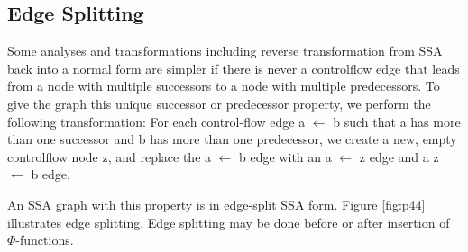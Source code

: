 

\subsection{Edge Splitting}

Some analyses and transformations including reverse transformation from SSA back into a normal form are simpler if there is never a controlflow edge that leads from a node with multiple successors to a node with multiple predecessors. To give the graph this unique successor or predecessor property, we perform the following transformation: For each control-flow edge a $\gets$ b such that a has more than one successor and b has more than one predecessor, we create a new, empty controlflow node z, and replace the a $\gets$ b edge with an a $\gets$ z edge and a z $\gets$ b edge.

An SSA graph with this property is in edge-split SSA form. Figure \ref{fig:p44} illustrates edge splitting. Edge splitting may be done before or after insertion of $\Phi$-functions.
